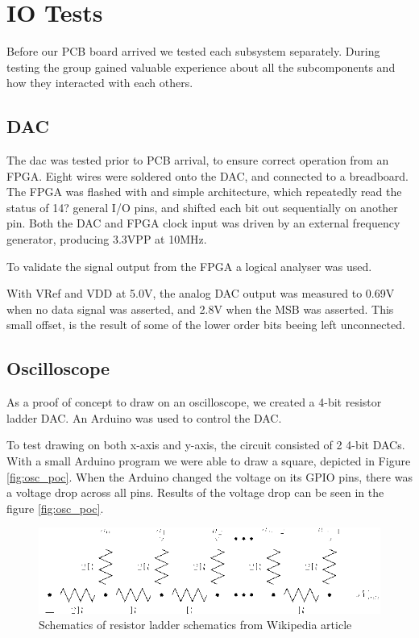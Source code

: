 \section{IO Tests}
Before our PCB board arrived we tested each subsystem separately.
During testing the group gained valuable experience about all the subcomponents and how they interacted with each others.

\subsection{DAC}
The dac was tested prior to PCB arrival, to ensure correct operation from an FPGA.
Eight wires were soldered onto the DAC, and connected to a breadboard.
The FPGA was flashed with and simple architecture, which repeatedly read the status of 14? general I/O pins, and shifted each bit out sequentially on another pin.
Both the DAC and FPGA clock input was driven by an external frequency generator, producing 3.3VPP at 10MHz.

To validate the signal output from the FPGA a logical analyser was used.

With VRef and VDD at 5.0V, the analog DAC output was measured to 0.69V when no data signal was asserted, and 2.8V when the MSB was asserted. This small offset, is the result of some of the lower order bits beeing left unconnected.

\subsection{Oscilloscope}
As a proof of concept to draw on an oscilloscope, we created a 4-bit resistor ladder DAC.
An Arduino was used to control the DAC.

To test drawing on both x-axis and y-axis, the circuit consisted of 2 4-bit DACs.
With a small Arduino program we were able to draw a square, depicted in Figure \ref{fig:osc_poc}.
When the Arduino changed the voltage on its GPIO pins, there was a voltage drop across all pins.
Results of the voltage drop can be seen in the figure \ref{fig:osc_poc}.


\begin{figure}[h]
\includegraphics[width=\columnwidth]{images/r2r-ladder}
\centering
\caption{Schematics of resistor ladder schematics from Wikipedia article \cite{r2r-ladder-schematics}}
\label{fig:r2r-ladder}
\end{figure}

